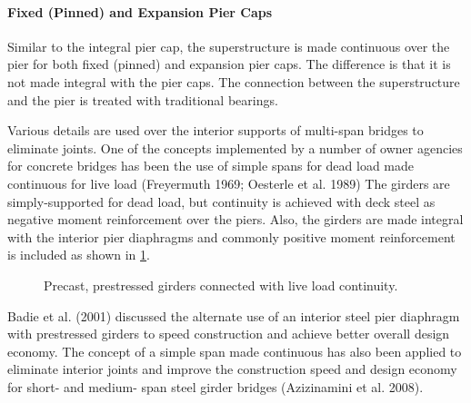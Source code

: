 \paragraph{Fixed (Pinned) and Expansion Pier Caps}

Similar to the integral pier cap, the superstructure is made continuous over the pier for both fixed (pinned) and
expansion pier caps. The difference is that it is not made integral with the pier caps. The connection between the
superstructure and the pier is treated with traditional bearings.

Various details are used over the interior supports of multi-span bridges to eliminate joints. One of the concepts
implemented by a number of owner agencies for concrete bridges has been the use of simple spans for dead load made
continuous for live load (Freyermuth 1969; Oesterle et al. 1989) The girders are simply-supported for dead load, but
continuity is achieved with deck steel as negative moment reinforcement over the piers. Also, the girders are made
integral with the interior pier diaphragms and commonly positive moment reinforcement is included as shown in
\cref{fig:continuity-live-load-connection}.

\begin{figure}
  \caption{Precast, prestressed girders connected with live load continuity.}
  \label{fig:continuity-live-load-connection}
\end{figure}

Badie et al. (2001) discussed the alternate use of an interior steel pier diaphragm with prestressed girders to speed
construction and achieve better overall design economy. The concept of a simple span made continuous has also been applied to eliminate interior joints and improve the construction speed and design economy for short- and medium-
span steel girder bridges (Azizinamini et al. 2008).

